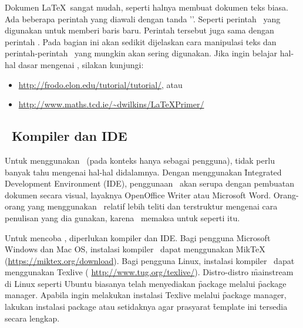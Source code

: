 \vspace*{0.8cm}

Dokumen \LaTeX~sangat mudah, seperti halnya membuat dokumen teks biasa.
Ada beberapa perintah yang diawali dengan tanda '\bslash'.
Seperti perintah \code{\bslash\bslash}~yang digunakan untuk memberi baris baru.
Perintah tersebut juga sama dengan perintah .
Pada bagian ini akan sedikit dijelaskan cara manipulasi teks dan perintah-perintah \latex~yang mungkin akan sering digunakan.
Jika ingin belajar hal-hal dasar mengenai \latex, silakan kunjungi:

\begin{itemize}
	\item \url{http://frodo.elon.edu/tutorial/tutorial/}, atau
	\item \url{http://www.maths.tcd.ie/~dwilkins/LaTeXPrimer/}
\end{itemize}

\subsection{\latex~Kompiler dan IDE}
\label{sec:latexCompiler}
Untuk menggunakan \latex~(pada konteks hanya sebagai pengguna), tidak perlu banyak tahu mengenai hal-hal didalamnya.
Dengan menggunakan \f{Integrated Development Environment} (IDE), penggunaan \latex~akan serupa dengan pembuatan dokumen secara visual, layaknya OpenOffice Writer atau Microsoft Word.
Orang-orang yang menggunakan \latex~relatif lebih teliti dan terstruktur mengenai cara penulisan yang dia gunakan, karena \latex~memaksa untuk seperti itu.

Untuk mencoba \latex, diperlukan kompiler dan IDE.
Bagi pengguna Microsoft Windows dan Mac OS, instalasi kompiler \latex~dapat menggunakan MikTeX (\url{https://miktex.org/download}).
Bagi pengguna Linux, instalasi kompiler \latex~dapat menggunakan Texlive ( \url{http://www.tug.org/texlive/}).
Distro-distro \f{mainstream} di Linux seperti Ubuntu biasanya telah menyediakan \f{package}  melalui \f{package manager}.
Apabila ingin melakukan instalasi Texlive melalui \f{package manager}, lakukan instalasi package  atau setidaknya  agar prasyarat \f{template} ini tersedia secara lengkap.

